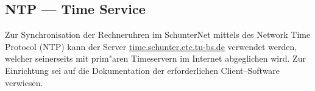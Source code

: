 \subsection{NTP --- Time Service}

Zur Synchronisation der Rechneruhren im SchunterNet mittels des Network Time
Protocol (NTP) kann der \glossar Server \url{time.schunter.etc.tu-bs.de}
verwendet werden, welcher seinerseits mit prim"aren Timeservern im Internet
abgeglichen wird. Zur Einrichtung sei auf die Dokumentation der erforderlichen
\glossar Client--Software verwiesen.